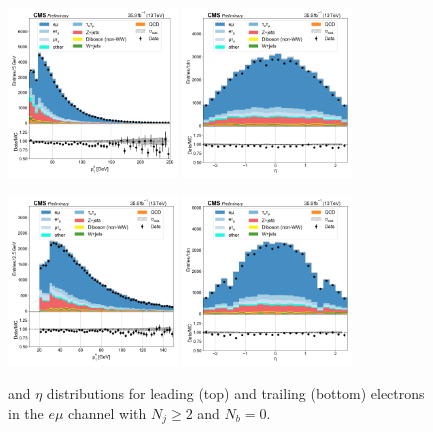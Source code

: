 \begin{figure}[htb!]
    \centering
    \includegraphics[width=0.4\textwidth]{chapters/Analysis/sectionPlots/figures/data_mc_overlays/emu_2016_cat_gt2_eq0_signal_linear_lepton_lepton1_pt}
    \includegraphics[width=0.4\textwidth]{chapters/Analysis/sectionPlots/figures/data_mc_overlays/emu_2016_cat_gt2_eq0_signal_linear_lepton_lepton1_eta}

    \includegraphics[width=0.4\textwidth]{chapters/Analysis/sectionPlots/figures/data_mc_overlays/emu_2016_cat_gt2_eq0_signal_linear_lepton_lepton2_pt}
    \includegraphics[width=0.4\textwidth]{chapters/Analysis/sectionPlots/figures/data_mc_overlays/emu_2016_cat_gt2_eq0_signal_linear_lepton_lepton2_eta}
    \caption{\pt and $\eta$ distributions for leading (top) and trailing
        (bottom) electrons in the $e\mu$ channel with $N_{j} \geq 2$ and
        $N_{b} = 0$.}
    \label{fig:analysis:plots:emu_4_kinematic}
\end{figure}

